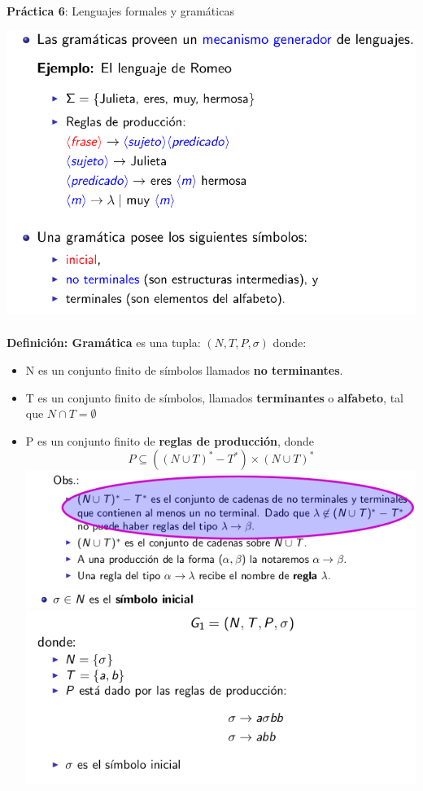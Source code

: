 \documentclass{article}
\begin{document}
\begin{center}
\large \textbf{Práctica 6}: Lenguajes formales y gramáticas
\end{center}
\graphicspath{ {./img/} }
\includegraphics[scale=0.4]{1.png} \\ \\
\textbf{Definición: Gramática} es una tupla: $(N,T,P,\sigma)$ donde: \\
\begin{itemize}
  \item
    N es un conjunto finito de símbolos llamados \textbf{no terminantes}.
  \item
    T es un conjunto finito de símbolos, llamados \textbf{terminantes} o \textbf{alfabeto},
    tal que $N \cap T = \emptyset$
  \item
    P es un conjunto finito de \textbf{reglas de producción}, donde
    \[ P \subseteq ((N \cup T)^{*} - T^{*}) \times (N \cup T)^{*}\]
    \includegraphics[scale=0.6]{4.png} \\
    \includegraphics[scale=0.5]{5.png}
\end{itemize}
\end{document}
